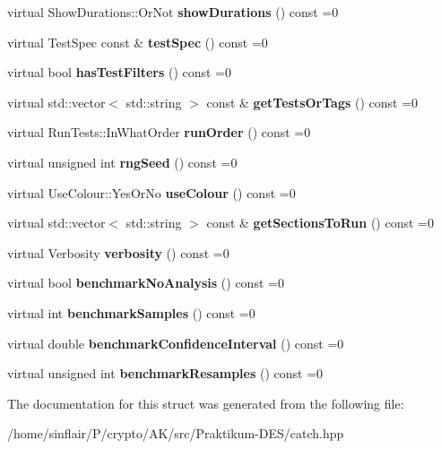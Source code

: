\begin{DoxyCompactItemize}
virtual Show\+Durations\+::\+Or\+Not {\bfseries show\+Durations} () const =0
\item 
\mbox{\label{structCatch_1_1IConfig_a03a2fd8221d896d12bf3684ab2a03588}} 
virtual Test\+Spec const  \& {\bfseries test\+Spec} () const =0
\item 
\mbox{\label{structCatch_1_1IConfig_a49a475bbeb3180c06799d6d958914649}} 
virtual bool {\bfseries has\+Test\+Filters} () const =0
\item 
\mbox{\label{structCatch_1_1IConfig_a1b8a299344a493eb98c12faae48421d7}} 
virtual std\+::vector$<$ std\+::string $>$ const  \& {\bfseries get\+Tests\+Or\+Tags} () const =0
\item 
\mbox{\label{structCatch_1_1IConfig_a0fc59c9aba1d4018538d5526daa5eb78}} 
virtual Run\+Tests\+::\+In\+What\+Order {\bfseries run\+Order} () const =0
\item 
\mbox{\label{structCatch_1_1IConfig_ae049eb45979d841073fa65d1094c7f14}} 
virtual unsigned int {\bfseries rng\+Seed} () const =0
\item 
\mbox{\label{structCatch_1_1IConfig_a87ec19a6b486eb5b5015cf7738fee026}} 
virtual Use\+Colour\+::\+Yes\+Or\+No {\bfseries use\+Colour} () const =0
\item 
\mbox{\label{structCatch_1_1IConfig_afc801995e115557f90e41f3d6e96908d}} 
virtual std\+::vector$<$ std\+::string $>$ const  \& {\bfseries get\+Sections\+To\+Run} () const =0
\item 
\mbox{\label{structCatch_1_1IConfig_a55aff5924bdbb3f558775821b1eb4b3d}} 
virtual Verbosity {\bfseries verbosity} () const =0
\item 
\mbox{\label{structCatch_1_1IConfig_aa9aa1eafdbe510e27bf319233969ee2c}} 
virtual bool {\bfseries benchmark\+No\+Analysis} () const =0
\item 
\mbox{\label{structCatch_1_1IConfig_a583734a61796b495b80779a6540eb6cc}} 
virtual int {\bfseries benchmark\+Samples} () const =0
\item 
\mbox{\label{structCatch_1_1IConfig_ae1ec73d460a2b58c7c9b022a430a34dd}} 
virtual double {\bfseries benchmark\+Confidence\+Interval} () const =0
\item 
\mbox{\label{structCatch_1_1IConfig_a3b8e5581be01f4773593f8b85eb7db98}} 
virtual unsigned int {\bfseries benchmark\+Resamples} () const =0
\end{DoxyCompactItemize}


The documentation for this struct was generated from the following file\+:\begin{DoxyCompactItemize}
\item 
/home/sinflair/\+P/crypto/\+A\+K/src/\+Praktikum-\/\+D\+E\+S/catch.\+hpp\end{DoxyCompactItemize}

